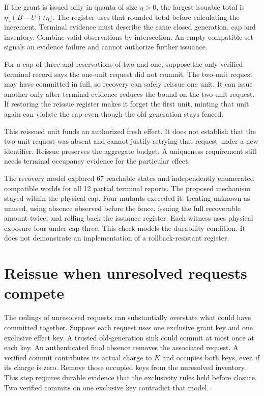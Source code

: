 \documentclass[11pt]{article}
\begin{document}
If the grant is issued only in quanta of size $\eta>0$, the
largest issuable total is $\eta\lfloor(B-U)/\eta\rfloor$.
The register uses that rounded total before calculating the
increment. Terminal evidence must describe the same closed
generation, cap and inventory. Combine valid observations by
intersection. An empty compatible set signals an evidence
failure and cannot authorize further issuance.

For a cap of three and reservations of two and one, suppose
the only verified terminal record says the one-unit request
did not commit. The two-unit request may have committed in full,
so recovery can safely reissue one unit. It can issue another
only after terminal evidence reduces the bound on the two-unit
request. If restoring the reissue register makes it forget the
first unit, minting that unit again can violate the cap even
though the old generation stays fenced.

This reissued unit funds an authorized fresh effect. It does
not establish that the two-unit request was absent and cannot
justify retrying that request under a new identifier. Reissue
preserves the aggregate budget. A uniqueness requirement still
needs terminal occupancy evidence for the particular effect.

The recovery model explored 67 reachable states and independently
enumerated compatible worlds for all 12 partial terminal reports.
The proposed mechanism stayed within the physical cap. Four
mutants exceeded it: treating unknown as unused, using absence
observed before the fence, issuing the full recoverable amount
twice, and rolling back the issuance register. Each witness
uses physical exposure four under cap three. This check models
the durability condition. It does not demonstrate an implementation
of a rollback-resistant register.

\section{Reissue when unresolved requests compete}
The ceilings of unresolved requests can substantially overstate
what could have committed together. Suppose each request uses
one exclusive grant key and one exclusive effect key. A trusted
old-generation sink could commit at most once at each key.
An authenticated final absence removes the associated request.
A verified commit contributes its actual charge to $K$ and
occupies both keys, even if its charge is zero. Remove those
occupied keys from the unresolved inventory. This step requires
durable evidence that the exclusivity rules held before closure.
Two verified commits on one exclusive key contradict that model.
\end{document}

